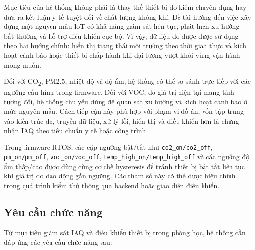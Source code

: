 Mục tiêu của hệ thống không phải là thay thế thiết bị đo kiểm chuyên dụng hay đưa ra kết
luận y tế tuyệt đối về chất lượng không khí. Đề tài hướng đến việc xây dựng một nguyên
mẫu IoT có khả năng giám sát liên tục, phát hiện xu hướng bất thường và hỗ trợ điều
khiển cục bộ. Vì vậy, dữ liệu đo được được sử dụng theo hai hướng chính: hiển thị trạng
thái môi trường theo thời gian thực và kích hoạt cảnh báo hoặc thiết bị chấp hành khi
đại lượng vượt khỏi vùng vận hành mong muốn.

Đối với CO\textsubscript{2}, PM2.5, nhiệt độ và độ ẩm, hệ thống có thể so sánh trực
tiếp với các ngưỡng cấu hình trong firmware. Đối với VOC, do giá trị hiện tại mang tính
tương đối, hệ thống chủ yếu dùng để quan sát xu hướng và kích hoạt cảnh báo ở mức
nguyên mẫu. Cách tiếp cận này phù hợp với phạm vi đồ án, vốn tập trung vào kiến trúc đo,
truyền dữ liệu, xử lý lỗi, hiển thị và điều khiển hơn là chứng nhận IAQ theo tiêu chuẩn
y tế hoặc công trình.

Trong firmware RTOS, các cặp ngưỡng bật/tắt như \texttt{co2\_on/co2\_off},
\texttt{pm\_on/pm\_off}, \texttt{voc\_on/voc\_off}, \texttt{temp\_high\_on/temp\_high\_off}
và các ngưỡng độ ẩm thấp/cao được dùng cùng cơ chế hysteresis để tránh thiết bị bật tắt
liên tục khi giá trị đo dao động gần ngưỡng. Các tham số này có thể được hiệu chỉnh
trong quá trình kiểm thử thông qua backend hoặc giao diện điều khiển.

\subsection{Yêu cầu chức năng}

Từ mục tiêu giám sát IAQ và điều khiển thiết bị trong phòng học, hệ thống cần đáp ứng
các yêu cầu chức năng sau:

